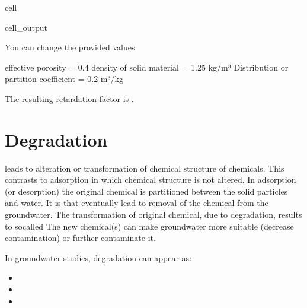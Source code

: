 \documentclass[letterpaper,10pt,english]{jupyterBook}
\begin{document}
\begin{sphinxuseclass}{cell}
\begin{sphinxVerbatimOutput}
\begin{sphinxuseclass}{cell_output}
\begin{sphinxVerbatim}[commandchars=\\\{\}]
 You can change the provided values.

effective porosity = 0.4
density of solid material = 1.25 kg/m³
Distribution or partition coefficient = 0.2 m³/kg

The resulting retardation factor is .
\end{sphinxVerbatim}

\end{sphinxuseclass}\end{sphinxVerbatimOutput}

\end{sphinxuseclass}

\section{Degradation}
\label{\detokenize{content/transport/L10/22_reactive_transport:degradation}}
\sphinxAtStartPar
{} leads to alteration or transformation of chemical structure of chemicals. This contrasts to adsorption in which chemical structure is not altered. In adsorption (or desorption) the original chemical is partitioned between the solid particles and water. It is  that eventually lead to removal of the  chemical from the groundwater. The transformation of original chemical, due to degradation, results to so\sphinxhyphen{}called  The new chemical(s) can make groundwater more suitable (decrease contamination) or further contaminate it.

\sphinxAtStartPar
In groundwater studies, degradation can appear as:
\begin{itemize}
\item {} 
\sphinxAtStartPar
{}

\item {} 
\sphinxAtStartPar
{}

\item {} 
\sphinxAtStartPar
{}

\end{itemize}
\end{document}
